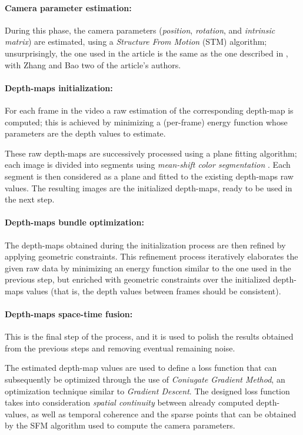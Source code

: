 \documentclass[notitlepage,english]{hgbreport}
\begin{document}
\paragraph{Camera parameter estimation:} During this phase, the camera parameters (\ie \emph{position}, \emph{rotation}, and \emph{intrinsic matrix}) are estimated, using a \emph{Structure From Motion} (STM) algorithm; unsurprisingly, the one used in the article is the same as the one described in \cite{Zhang2007}, with Zhang and Bao two of the article's authors.

\paragraph{Depth-maps initialization:} 
For each frame in the video a raw estimation of the corresponding depth-map is computed; this is achieved by minimizing a (per-frame) energy function whose parameters are the depth values to estimate.

These raw depth-maps are successively processed using a plane fitting algorithm; each image is divided into segments using \emph{mean-shift color segmentation} \cite{Comaniciu202}. Each segment is then considered as a plane and fitted to the existing depth-maps raw values. The resulting images are the initialized depth-maps, ready to be used in the next step.

\paragraph{Depth-maps bundle optimization:} The depth-maps obtained during the initialization process are then refined by applying geometric constraints. This refinement process iteratively elaborates the given raw data by minimizing an energy function similar to the one used in the previous step, but enriched with geometric constraints over the initialized depth-maps values (that is, the depth values between frames should be consistent).

\paragraph{Depth-maps space-time fusion:} This is the final step of the process, and it is used to polish the results obtained from the previous steps and removing eventual remaining noise.

The estimated depth-map values are used to define a loss function  that can subsequently be optimized through the use of \emph{Coniugate Gradient Method}, an optimization technique similar to \emph{ Gradient Descent}.
The designed loss function takes into consideration \emph{spatial continuity} between already computed depth-values, as well as temporal coherence and the sparse points that can be obtained by the SFM algorithm  used to compute the camera parameters.
\end{document}
